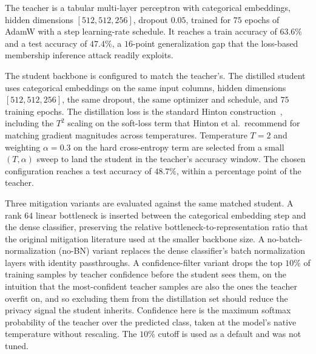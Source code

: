 \documentclass[conference]{IEEEtran}
\begin{document}
The teacher is a tabular multi-layer perceptron with categorical embeddings, hidden dimensions $[512, 512, 256]$, dropout $0.05$, trained for $75$ epochs of AdamW with a step learning-rate schedule. It reaches a train accuracy of $63.6\%$ and a test accuracy of $47.4\%$, a $16$-point generalization gap that the loss-based membership inference attack readily exploits.

The student backbone is configured to match the teacher's. The distilled student uses categorical embeddings on the same input columns, hidden dimensions $[512, 512, 256]$, the same dropout, the same optimizer and schedule, and $75$ training epochs. The distillation loss is the standard Hinton construction~\cite{hinton2015}, including the $T^2$ scaling on the soft-loss term that Hinton et al.\ recommend for matching gradient magnitudes across temperatures. Temperature $T = 2$ and weighting $\alpha = 0.3$ on the hard cross-entropy term are selected from a small $(T, \alpha)$ sweep to land the student in the teacher's accuracy window. The chosen configuration reaches a test accuracy of $48.7\%$, within a percentage point of the teacher.

Three mitigation variants are evaluated against the same matched student. A rank $64$ linear bottleneck is inserted between the categorical embedding step and the dense classifier, preserving the relative bottleneck-to-representation ratio that the original mitigation literature used at the smaller backbone size. A no-batch-normalization (no-BN) variant replaces the dense classifier's batch normalization layers with identity passthroughs. A confidence-filter variant drops the top $10\%$ of training samples by teacher confidence before the student sees them, on the intuition that the most-confident teacher samples are also the ones the teacher overfit on, and so excluding them from the distillation set should reduce the privacy signal the student inherits. Confidence here is the maximum softmax probability of the teacher over the predicted class, taken at the model's native temperature without rescaling. The $10\%$ cutoff is used as a default and was not tuned.
\end{document}
